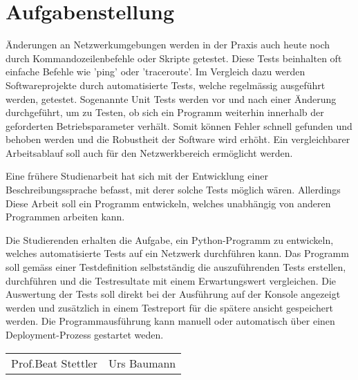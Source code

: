 \documentclass[]{subfiles}
\begin{document}
\section*{Aufgabenstellung}

Änderungen an Netzwerkumgebungen werden in der Praxis auch heute 
noch durch Kommandozeilenbefehle oder Skripte getestet.
Diese Tests beinhalten oft einfache Befehle wie 'ping' oder 'traceroute'.
Im Vergleich dazu werden Softwareprojekte durch automatisierte Tests, 
welche regelmässig ausgeführt werden, getestet.
Sogenannte Unit Tests werden vor und nach einer Änderung durchgeführt, 
um zu Testen, ob sich ein Programm weiterhin innerhalb der geforderten 
Betriebsparameter verhält. 
Somit können Fehler schnell gefunden und behoben werden und die Robustheit
der Software wird erhöht.
Ein vergleichbarer Arbeitsablauf soll auch für den Netzwerkbereich ermöglicht werden.

Eine frühere Studienarbeit hat sich mit der Entwicklung einer Beschreibungssprache
befasst, mit derer solche Tests möglich wären.
Allerdings 
Diese Arbeit soll ein Programm entwickeln, welches unabhängig von anderen
Programmen arbeiten kann.

Die Studierenden erhalten die Aufgabe, ein Python-Programm zu entwickeln, 
welches automatisierte Tests auf ein Netzwerk durchführen kann.
Das Programm soll gemäss einer Testdefinition selbstständig die 
auszuführenden Tests erstellen, durchführen und die Testresultate mit
einem Erwartungswert vergleichen. 
Die Auswertung der Tests soll direkt bei der Ausführung auf der Konsole
angezeigt werden und zusätzlich in einem Testreport für die spätere 
ansicht gespeichert werden.
Die Programmausführung kann manuell oder automatisch über einen Deployment-Prozess
gestartet weden.

\vspace{5cm}

\begin{tabularx}{\textwidth}{XX}
    Prof.Beat Stettler & Urs Baumann \\
\end{tabularx}

    
\end{document}
